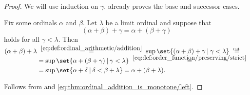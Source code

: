 \begin{proof}
   We will use induction on \( \gamma \).  already proves the base and successor cases.

  Fix some ordinals \( \alpha \) and \( \beta \). Let \( \lambda \) be a limit ordinal and suppose that
  \begin{equation*}
    (\alpha + \beta) + \gamma = \alpha + (\beta + \gamma)
  \end{equation*}
  holds for all \( \gamma < \lambda \). Then
  \begin{align*}
    (\alpha + \beta) + \lambda
    &\reloset {\eqref{eq:def:ordinal_arithmetic/addition}} =
    \sup\set{ (\alpha + \beta) + \gamma \given \gamma < \lambda }
    \reloset {\T{ind.}} = \\ &=
    \sup\set{ \alpha + (\beta + \gamma) \given \gamma < \lambda }
    \reloset {\eqref{eq:def:order_function/preserving/strict}} = \\ &=
    \sup\set{ \alpha + \delta \given \delta < \beta + \lambda }
    =
    \alpha + (\beta + \lambda).
  \end{align*}

   Follows from  and \eqref{eq:thm:ordinal_addition_is_monotone/left}.
\end{proof}

